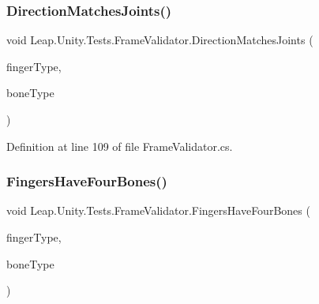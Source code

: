 \mbox{\label{class_leap_1_1_unity_1_1_tests_1_1_frame_validator_ad4790f2f0631567aaced9032c3bd5f4f}} 
\subsubsection{\texorpdfstring{DirectionMatchesJoints()}{DirectionMatchesJoints()}}
{\footnotesize\ttfamily void Leap.\+Unity.\+Tests.\+Frame\+Validator.\+Direction\+Matches\+Joints (\begin{DoxyParamCaption}\item[{\mbox{[}\+Value\+Source(typeof(\+Frame\+Validator), \char`\"{}\+\_\+fingers\char`\"{})\mbox{]} \mbox{\hyperlink{class_leap_1_1_finger_ae75e8d46a01aff0bd5c6d6fb99e2f2ba}{Finger.\+Finger\+Type}}}]{finger\+Type,  }\item[{\mbox{[}\+Value\+Source(typeof(\+Frame\+Validator), \char`\"{}\+\_\+bones\char`\"{})\mbox{]} \mbox{\hyperlink{class_leap_1_1_bone_a21054e31cefa7b75f25a026006fdbb1b}{Bone.\+Bone\+Type}}}]{bone\+Type }\end{DoxyParamCaption})}



Definition at line 109 of file Frame\+Validator.\+cs.

\mbox{\label{class_leap_1_1_unity_1_1_tests_1_1_frame_validator_a918c59aec010758d457bc76c841bb2ea}} 
\subsubsection{\texorpdfstring{FingersHaveFourBones()}{FingersHaveFourBones()}}
{\footnotesize\ttfamily void Leap.\+Unity.\+Tests.\+Frame\+Validator.\+Fingers\+Have\+Four\+Bones (\begin{DoxyParamCaption}\item[{\mbox{[}\+Value\+Source(typeof(\+Frame\+Validator), \char`\"{}\+\_\+fingers\char`\"{})\mbox{]} \mbox{\hyperlink{class_leap_1_1_finger_ae75e8d46a01aff0bd5c6d6fb99e2f2ba}{Finger.\+Finger\+Type}}}]{finger\+Type,  }\item[{\mbox{[}\+Value\+Source(typeof(\+Frame\+Validator), \char`\"{}\+\_\+bones\char`\"{})\mbox{]} \mbox{\hyperlink{class_leap_1_1_bone_a21054e31cefa7b75f25a026006fdbb1b}{Bone.\+Bone\+Type}}}]{bone\+Type }\end{DoxyParamCaption})}



